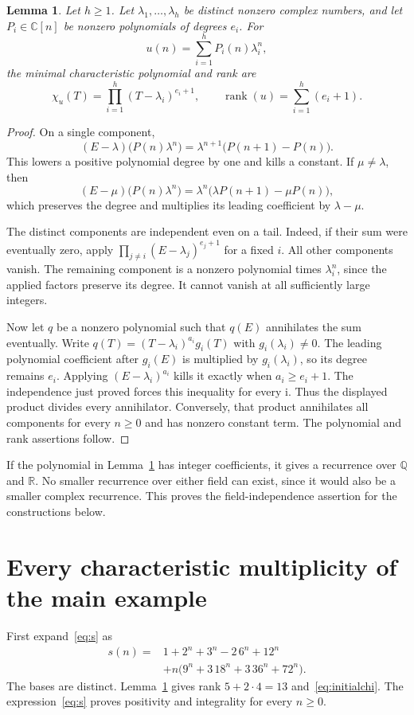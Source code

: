 \documentclass[11pt,a4paper]{article}
\newtheorem{lemma}[theorem]{Lemma}
\newcommand{\rank}{\operatorname{rank}}
\newcommand{\CC}{\mathbb C}
\newcommand{\QQ}{\mathbb Q}
\begin{document}
\begin{lemma}\label{lem:rank}
Let $h\ge1$. Let $\lambda_1,\ldots,\lambda_h$ be distinct nonzero complex
numbers, and let $P_i\in\CC[n]$ be nonzero polynomials of degrees $e_i$.
For
\[
 u(n)=\sum_{i=1}^hP_i(n)\lambda_i^n,
\]
the minimal characteristic polynomial and rank are
\[
 \chi_u(T)=\prod_{i=1}^h(T-\lambda_i)^{e_i+1},\qquad
 \rank(u)=\sum_{i=1}^h(e_i+1).
\]
\end{lemma}
\begin{proof}
On a single component,
\[
 (E-\lambda)\bigl(P(n)\lambda^n\bigr)
 =\lambda^{n+1}\bigl(P(n+1)-P(n)\bigr).
\]
This lowers a positive polynomial degree by one and kills a constant.
If $\mu\ne\lambda$, then
\[
 (E-\mu)\bigl(P(n)\lambda^n\bigr)
 =\lambda^n\bigl(\lambda P(n+1)-\mu P(n)\bigr),
\]
which preserves the degree and multiplies its leading coefficient by
$\lambda-\mu$.

The distinct components are independent even on a tail. Indeed, if their sum
were eventually zero, apply $\prod_{j\ne i}(E-\lambda_j)^{e_j+1}$ for a fixed $i$.
All other components vanish. The remaining component is a nonzero polynomial
times $\lambda_i^n$, since the applied factors preserve its degree.
It cannot vanish at all sufficiently large integers.

Now let $q$ be a nonzero polynomial such that $q(E)$ annihilates the sum eventually. Write
$q(T)=(T-\lambda_i)^{a_i}g_i(T)$ with $g_i(\lambda_i)\ne0$.
The leading polynomial coefficient after $g_i(E)$ is multiplied by
$g_i(\lambda_i)$, so its degree remains $e_i$.
Applying $(E-\lambda_i)^{a_i}$ kills it exactly when $a_i\ge e_i+1$.
The independence just proved forces this inequality for every i.
Thus the displayed product divides every annihilator. Conversely, that product
annihilates all components for every $n\ge0$ and has nonzero constant term.
The polynomial and rank assertions follow.
\end{proof}

If the polynomial in Lemma~\ref{lem:rank} has integer coefficients, it gives
a recurrence over $\QQ$ and $\mathbb R$. No smaller recurrence over either
field can exist, since it would also be a smaller complex recurrence.
This proves the field-independence assertion for the constructions below.

\section{Every characteristic multiplicity of the main example}
First expand~\eqref{eq:s} as
\begin{equation}\label{eq:expand-s}
 \begin{split}
 s(n)={}&1+2^n+3^n-2\,6^n+12^n\\
 &+n\bigl(9^n+3\,18^n+3\,36^n+72^n\bigr).
 \end{split}
\end{equation}
The bases are distinct. Lemma~\ref{lem:rank} gives rank $5+2\cdot4=13$
and~\eqref{eq:initialchi}. The expression~\eqref{eq:s} proves positivity and
integrality for every $n\ge0$.
\end{document}
